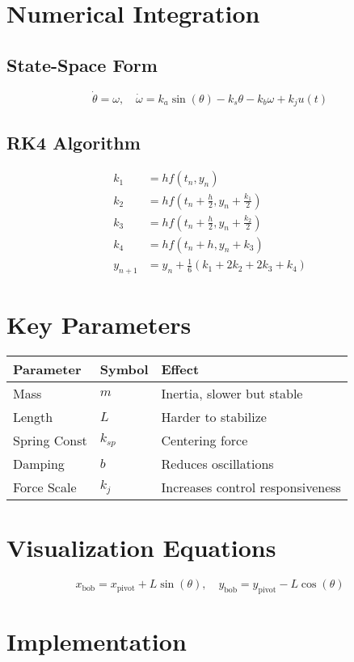 \documentclass[11pt]{article}
\begin{document}
\section{Numerical Integration}

\subsection{State-Space Form}
\[
\dot{\theta} = \omega, \quad
\dot{\omega} = k_a \sin(\theta) - k_s \theta - k_b \omega + k_j u(t)
\]

\subsection{RK4 Algorithm}
\[
\begin{aligned}
k_1 &= h f(t_n, y_n) \\
k_2 &= h f(t_n + \frac{h}{2}, y_n + \frac{k_1}{2}) \\
k_3 &= h f(t_n + \frac{h}{2}, y_n + \frac{k_2}{2}) \\
k_4 &= h f(t_n + h, y_n + k_3) \\
y_{n+1} &= y_n + \frac{1}{6}(k_1 + 2k_2 + 2k_3 + k_4)
\end{aligned}
\]

\section{Key Parameters}

\begin{tabular}{@{}lll@{}}
\toprule
Parameter & Symbol & Effect \\
\midrule
Mass & $m$ & Inertia, slower but stable \\
Length & $L$ & Harder to stabilize \\
Spring Const & $k_{sp}$ & Centering force \\
Damping & $b$ & Reduces oscillations \\
Force Scale & $k_j$ & Increases control responsiveness \\
\bottomrule
\end{tabular}

\section{Visualization Equations}
\[
x_{\text{bob}} = x_{\text{pivot}} + L \sin(\theta), \quad
y_{\text{bob}} = y_{\text{pivot}} - L \cos(\theta)
\]

\section{Implementation}
\end{document}
